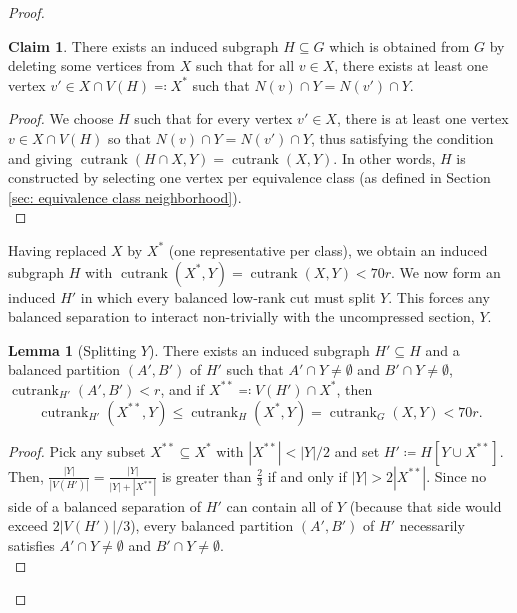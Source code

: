 \documentclass{article}
\theoremstyle{definition}
\newtheorem{lemma}[theorem]{Lemma}
\newtheorem{claim}[theorem]{Claim}
\begin{document}
\begin{proof}
\begin{claim}
\label{claim:findingH}
    There exists an induced subgraph $H\subseteq G$ which is obtained from $G$ by deleting some vertices from $X$ such that for  all $v\in X$, there exists at least one vertex $v'\in X\cap V(H) \eqqcolon X^*$ such that $N(v)\cap Y = N(v')\cap Y$.
\end{claim}
\begin{proof}
We choose $H$ such that for every vertex $v'\in X$, there is at least one vertex $v \in X\cap V(H)$ so that $N(v)\cap Y = N(v')\cap Y$, thus satisfying the condition and giving $\operatorname{cutrank}(H\cap X, Y) = \operatorname{cutrank}(X, Y)$. In other words, $H$ is constructed by selecting one vertex per equivalence class (as defined in Section \ref{sec: equivalence class neighborhood}).
\qedhere\\
\end{proof}

Having replaced $X$ by $X^*$ (one representative per class), we obtain an induced subgraph $H$ with $\operatorname{cutrank}(X^*, Y) = \operatorname{cutrank}(X,Y) < 70r$. We now form an induced $H'$ in which every balanced low‑rank cut must split $Y$. This forces any balanced separation to interact non-trivially with the uncompressed section, $Y$.\\

\begin{lemma}[Splitting $Y$]
    \label{lemma: splitting Y reduction}
    There exists an induced subgraph $H'\subseteq H$ and a balanced partition $(A', B')$ of $H'$ such that $A' \cap Y \neq \emptyset$ and $B'\cap Y\neq\emptyset$, $\operatorname{cutrank}_{H'}(A', B') < r$, and if $X^{**} \eqqcolon V(H') \cap X^*$, then \[\operatorname{cutrank}_{H'}(X^{**}, Y) \leq \operatorname{cutrank}_H(X^*, Y) = \operatorname{cutrank}_G(X,Y) < 70r.\]
\end{lemma}
\begin{proof}
    Pick any subset $X^{**}\subseteq X^*$ with $|X^{**}| < |Y|/2$ and set $H' \coloneqq H[Y\cup X^{**}]$. Then, $\frac{|Y|}{|V(H')|} = \frac{|Y|}{|Y|+|X^{**}|}$ is greater than $\frac{2}{3}$ if and only if $|Y|>2|X^{**}|$. Since no side of a balanced separation of $H'$ can contain all of $Y$ (because that side would exceed $2|V(H')|/3$), every balanced partition $(A', B')$ of $H'$ necessarily satisfies $A'\cap Y \neq \emptyset$ and $B' \cap Y \neq \emptyset$. \\
    

\end{proof}
\end{proof}
\end{document}
